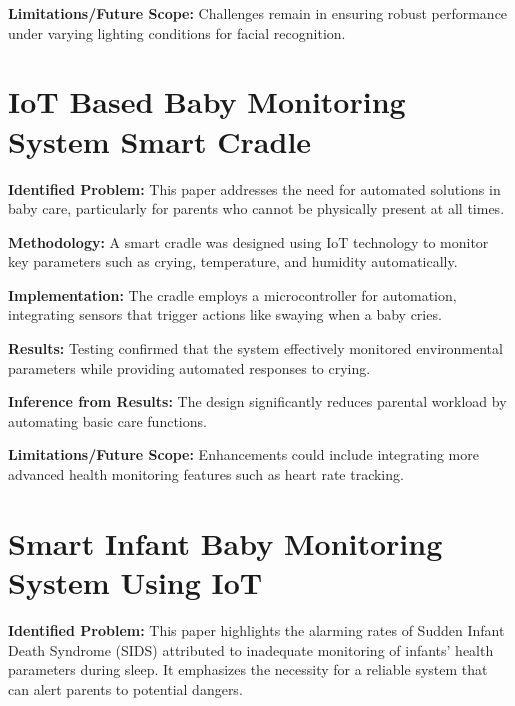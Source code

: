 \documentclass[12pt,a4paper]{report}
\begin{document}
\setlength{\parskip}{1em}  %

\noindent\textbf{Limitations/Future Scope:} Challenges remain in ensuring robust performance under varying lighting conditions for facial recognition.
\setlength{\parskip}{1em}  %


\section{IoT Based Baby Monitoring System Smart Cradle}
\textbf{Identified Problem: }This paper addresses the need for automated solutions in baby care, particularly for parents who cannot be physically present at all times\cite{9442022}.

\setlength{\parskip}{1em}  %


\noindent\textbf{Methodology:} A smart cradle was designed using IoT technology to monitor key parameters such as crying, temperature, and humidity automatically.

\setlength{\parskip}{1em}  %


\noindent\textbf{Implementation:}  The cradle employs a microcontroller for automation, integrating sensors that trigger actions like swaying when a baby cries.
\setlength{\parskip}{1em}  %

\noindent\textbf{Results:} Testing confirmed that the system effectively monitored environmental parameters while providing automated responses to crying.

\setlength{\parskip}{1em}  %


\noindent\textbf{Inference from Results:} The design significantly reduces parental workload by automating basic care functions.


\setlength{\parskip}{1em}  %

\noindent\textbf{Limitations/Future Scope:} Enhancements could include integrating more advanced health monitoring features such as heart rate tracking.
\setlength{\parskip}{1em}  %



\section{Smart Infant Baby Monitoring System Using IoT}
\textbf{Identified Problem:} This paper highlights the alarming rates of Sudden Infant Death Syndrome (SIDS) attributed to inadequate monitoring of infants' health parameters during sleep. It emphasizes the necessity for a reliable system that can alert parents to potential dangers\cite{Kumar2023}.
\end{document}

